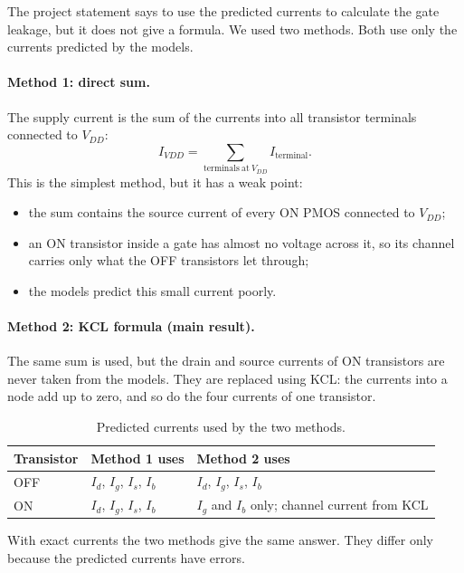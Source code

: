 \documentclass{article}
\begin{document}
The project statement says to use the predicted currents to calculate the
gate leakage, but it does not give a formula. We used two methods. Both use
only the currents predicted by the models.

\paragraph{Method 1: direct sum.}
The supply current is the sum of the currents into all transistor terminals
connected to $V_{DD}$:
\begin{equation}
I_{VDD} = \sum_{\mathrm{terminals\ at\ } V_{DD}} I_{\mathrm{terminal}}.
\end{equation}
This is the simplest method, but it has a weak point:
\begin{itemize}
    \item the sum contains the source current of every ON PMOS connected to
          $V_{DD}$;
    \item an ON transistor inside a gate has almost no voltage across it, so
          its channel carries only what the OFF transistors let through;
    \item the models predict this small current poorly.
\end{itemize}

\paragraph{Method 2: KCL formula (main result).}
The same sum is used, but the drain and source currents of ON transistors
are never taken from the models. They are replaced using KCL: the currents
into a node add up to zero, and so do the four currents of one transistor.

\begin{table}[H]
\centering
\begin{tabular}{|l|l|l|}
\hline
Transistor & Method 1 uses & Method 2 uses \\
\hline
OFF & $I_d$, $I_g$, $I_s$, $I_b$ & $I_d$, $I_g$, $I_s$, $I_b$ \\
ON  & $I_d$, $I_g$, $I_s$, $I_b$ & $I_g$ and $I_b$ only; channel current from KCL \\
\hline
\end{tabular}
\caption{Predicted currents used by the two methods.}
\label{tab:used}
\end{table}

With exact currents the two methods give the same answer. They differ only
because the predicted currents have errors.
\end{document}
